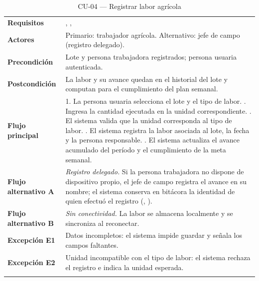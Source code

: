 \begin{longtable}{|L{3.4cm}|L{12.0cm}|}
\hline
{}\\
\hline
\textbf{Requisitos} & , ,  \\ \hline
\textbf{Actores} & Primario: trabajador agrícola. Alternativo: jefe de campo (registro delegado). \\ \hline
\textbf{Precondición} & Lote y persona trabajadora registrados; persona usuaria autenticada. \\ \hline
\textbf{Postcondición} & La labor y su avance quedan en el historial del lote y computan para el cumplimiento del plan semanal. \\ \hline
\textbf{Flujo principal} & 1. La persona usuaria selecciona el lote y el tipo de labor. . Ingresa la cantidad ejecutada en la unidad correspondiente. . El sistema valida que la unidad corresponda al tipo de labor. . El sistema registra la labor asociada al lote, la fecha y la persona responsable. . El sistema actualiza el avance acumulado del período y el cumplimiento de la meta semanal. \\ \hline
\textbf{Flujo alternativo A} & \emph{Registro delegado.} Si la persona trabajadora no dispone de dispositivo propio, el jefe de campo registra el avance en su nombre; el sistema conserva en bitácora la identidad de quien efectuó el registro (, ). \\ \hline
\textbf{Flujo alternativo B} & \emph{Sin conectividad.} La labor se almacena localmente y se sincroniza al reconectar. \\ \hline
\textbf{Excepción E1} & Datos incompletos: el sistema impide guardar y señala los campos faltantes. \\ \hline
\textbf{Excepción E2} & Unidad incompatible con el tipo de labor: el sistema rechaza el registro e indica la unidad esperada. \\ \hline
\caption{CU-04 --- Registrar labor agrícola}
\end{longtable}

